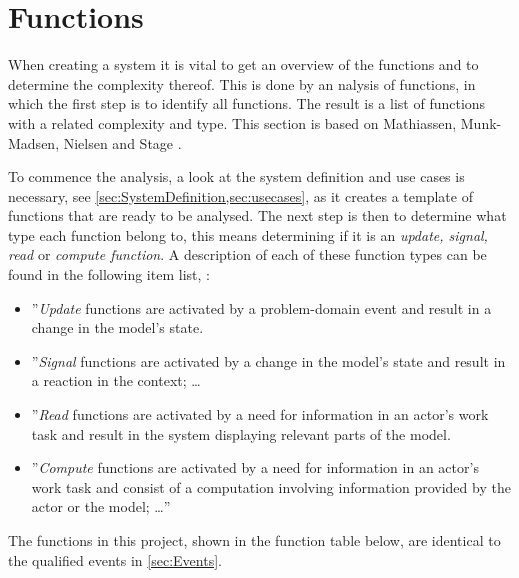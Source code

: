 \section{Functions} \label{sec:functions}
When creating a system it is vital to get an overview of the functions and to determine the complexity thereof.
This is done by an nalysis of functions, in which the first step is to identify all functions.
The result is a list of functions with a related complexity and type.
This section is based on Mathiassen, Munk-Madsen, Nielsen and Stage \citep[ch.~7]{Rod-Aalborg}.

To commence the analysis, a look at the system definition and use cases is necessary, see \cref{sec:SystemDefinition,sec:usecases}, as it creates a template of functions that are ready to be analysed.
The next step is then to determine what type each function belong to, this means determining if it is an \textit{update, signal, read} or \textit{compute function}.
A description of each of these function types can be found in the following item list, \citep[p.~140]{Rod-Aalborg}:

\begin{itemize}
	\item 
	''\textit{Update} functions are  activated by a problem-domain event and result in a change in the model's state.
	\item 
	''\textit{Signal} functions are activated by a change in the model's state and result in a reaction in the context; \ldots
	\item
	''\textit{Read} functions are activated by a need for information in an actor's work task and result in the system displaying relevant parts of the model.
	\item
	''\textit{Compute} functions are activated by a need for information in an actor's work task and consist of a computation involving information provided by the actor or the model; \ldots''
\end{itemize}

The functions in this project, shown in the function table below, are identical to the qualified events in \cref{sec:Events}.


